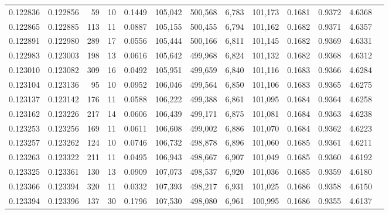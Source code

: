 \begin{tabular}{rrrrrrrrrrrrr}
0.122836 & 0.122856 &    59 &  10 &                                     0.1449 & 105,042 & 500,568 &   6,783 & 101,173 & 0.1681 & 0.9372 & 4.6368 \\
0.122865 & 0.122885 &   113 &  11 &                                     0.0887 & 105,155 & 500,455 &   6,794 & 101,162 & 0.1682 & 0.9371 & 4.6357 \\
0.122891 & 0.122980 &   289 &  17 &                                     0.0556 & 105,444 & 500,166 &   6,811 & 101,145 & 0.1682 & 0.9369 & 4.6331 \\
0.122983 & 0.123003 &   198 &  13 &                                     0.0616 & 105,642 & 499,968 &   6,824 & 101,132 & 0.1682 & 0.9368 & 4.6312 \\
0.123010 & 0.123082 &   309 &  16 &                                     0.0492 & 105,951 & 499,659 &   6,840 & 101,116 & 0.1683 & 0.9366 & 4.6284 \\
0.123104 & 0.123136 &    95 &  10 &                                     0.0952 & 106,046 & 499,564 &   6,850 & 101,106 & 0.1683 & 0.9365 & 4.6275 \\
0.123137 & 0.123142 &   176 &  11 &                                     0.0588 & 106,222 & 499,388 &   6,861 & 101,095 & 0.1684 & 0.9364 & 4.6258 \\
0.123162 & 0.123226 &   217 &  14 &                                     0.0606 & 106,439 & 499,171 &   6,875 & 101,081 & 0.1684 & 0.9363 & 4.6238 \\
0.123253 & 0.123256 &   169 &  11 &                                     0.0611 & 106,608 & 499,002 &   6,886 & 101,070 & 0.1684 & 0.9362 & 4.6223 \\
0.123257 & 0.123262 &   124 &  10 &                                     0.0746 & 106,732 & 498,878 &   6,896 & 101,060 & 0.1685 & 0.9361 & 4.6211 \\
0.123263 & 0.123322 &   211 &  11 &                                     0.0495 & 106,943 & 498,667 &   6,907 & 101,049 & 0.1685 & 0.9360 & 4.6192 \\
0.123325 & 0.123361 &   130 &  13 &                                     0.0909 & 107,073 & 498,537 &   6,920 & 101,036 & 0.1685 & 0.9359 & 4.6180 \\
0.123366 & 0.123394 &   320 &  11 &                                     0.0332 & 107,393 & 498,217 &   6,931 & 101,025 & 0.1686 & 0.9358 & 4.6150 \\
0.123394 & 0.123396 &   137 &  30 &                                     0.1796 & 107,530 & 498,080 &   6,961 & 100,995 & 0.1686 & 0.9355 & 4.6137 \\

\end{tabular}
